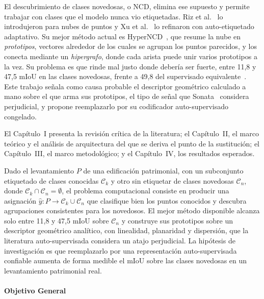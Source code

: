 El descubrimiento de clases novedosas, o NCD, elimina ese supuesto y permite
trabajar con clases que el modelo nunca vio etiquetadas. Riz et
al.~\cite{riz2023nops} lo introdujeron para nubes de puntos y Xu et
al.~\cite{xu2024dasl} lo refinaron con auto-etiquetado adaptativo. Su mejor
método actual es HyperNCD~\cite{zhang2026hyperncd}, que resume la nube en
\emph{prototipos}, vectores alrededor de los cuales se agrupan los puntos
parecidos, y los conecta mediante un \emph{hipergrafo}, donde cada arista puede
unir varios prototipos a la vez. Su problema es que rinde mal justo donde debería
ser fuerte, entre 11,8 y 47,5 mIoU en las clases novedosas, frente a 49,8 del
supervisado equivalente~\cite{zhang2026hyperncd}. Este trabajo señala como causa probable
el descriptor geométrico calculado a mano sobre el que arma sus prototipos, el
tipo de señal que Sonata~\cite{wu2025sonata} considera perjudicial, y propone
reemplazarlo por su codificador auto-supervisado congelado.

El Capítulo~I presenta la revisión crítica de la literatura; el Capítulo~II, el
marco teórico y el análisis de arquitectura del que se deriva el punto de la
sustitución; el Capítulo~III, el marco metodológico; y el Capítulo~IV, los
resultados esperados.


Dado el levantamiento $P$ de una edificación patrimonial, con un subconjunto
etiquetado de clases conocidas $\mathcal{C}_k$ y otro sin etiquetar de clases
novedosas $\mathcal{C}_n$, donde $\mathcal{C}_k\cap\mathcal{C}_n=\emptyset$, el problema computacional consiste en producir una asignación
$\hat{y}:P\rightarrow\mathcal{C}_k\cup\mathcal{C}_n$ que clasifique bien los
puntos conocidos y descubra agrupaciones consistentes para los novedosos. El mejor método disponible
alcanza solo entre 11,8 y 47,5 mIoU sobre $\mathcal{C}_n$ y construye sus
prototipos sobre un descriptor geométrico analítico, con linealidad, planaridad y
dispersión, que la literatura auto-supervisada considera un atajo perjudicial. La
hipótesis de investigación es que reemplazarlo por una representación
auto-supervisada confiable aumenta de forma medible el mIoU sobre las clases
novedosas en un levantamiento patrimonial real.


\paragraph*{Objetivo General}

